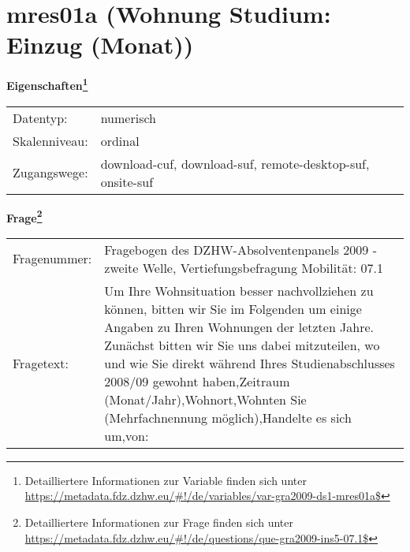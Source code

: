 
    \setcounter{footnote}{0}

    \vspace*{-1.8cm}
	\section{mres01a (Wohnung Studium: Einzug (Monat))}
	\label{section:mres01a}



    \vspace*{0.5cm}
    \noindent\textbf{Eigenschaften\footnote{Detailliertere Informationen zur Variable finden sich unter
		\url{https://metadata.fdz.dzhw.eu/\#!/de/variables/var-gra2009-ds1-mres01a$}}}\\
	\begin{tabularx}{\hsize}{@{}lX}
	Datentyp: & numerisch \\
	Skalenniveau: & ordinal \\
	Zugangswege: &
	  download-cuf, 
	  download-suf, 
	  remote-desktop-suf, 
	  onsite-suf
 \\
    \end{tabularx}



				\vspace*{0.5cm}
                \noindent\textbf{Frage\footnote{Detailliertere Informationen zur Frage finden sich unter
		              \url{https://metadata.fdz.dzhw.eu/\#!/de/questions/que-gra2009-ins5-07.1$}}}\\
				\begin{tabularx}{\hsize}{@{}lX}
					Fragenummer: &
					  Fragebogen des DZHW-Absolventenpanels 2009 - zweite Welle, Vertiefungsbefragung Mobilität:
					  07.1
 \\
					Fragetext: & Um Ihre Wohnsituation besser nachvollziehen zu können, bitten wir Sie im Folgenden um einige Angaben zu Ihren Wohnungen der letzten Jahre. Zunächst bitten wir Sie uns dabei mitzuteilen, wo und wie Sie direkt während Ihres Studienabschlusses 2008/09 gewohnt haben,Zeitraum (Monat/Jahr),Wohnort,Wohnten Sie (Mehrfachnennung möglich),Handelte es sich um,von: \\
				\end{tabularx}





